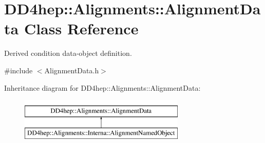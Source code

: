 \hypertarget{class_d_d4hep_1_1_alignments_1_1_alignment_data}{}\section{D\+D4hep\+:\+:Alignments\+:\+:Alignment\+Data Class Reference}
\label{class_d_d4hep_1_1_alignments_1_1_alignment_data}


Derived condition data-\/object definition.  




{\ttfamily \#include $<$Alignment\+Data.\+h$>$}

Inheritance diagram for D\+D4hep\+:\+:Alignments\+:\+:Alignment\+Data\+:\begin{figure}[H]
\begin{center}
\leavevmode
\includegraphics[height=2.000000cm]{class_d_d4hep_1_1_alignments_1_1_alignment_data}
\end{center}
\end{figure}
